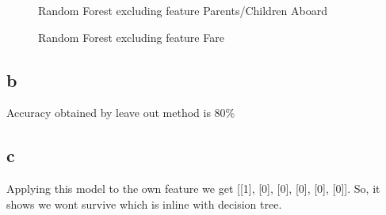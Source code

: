 \documentclass{article}
\begin{document}
\begin{figure}
    \caption{Random Forest excluding feature Parents/Children Aboard}
\end{figure}
\begin{figure}
    \caption{Random Forest excluding feature Fare}
\end{figure}
\subsection{b}
Accuracy obtained by leave out method is 80\%
\subsection{c}
Applying this model to the own feature we get [[1], [0], [0], [0], [0], [0]].
So, it shows we wont survive which is inline with decision tree.
\end{document}
